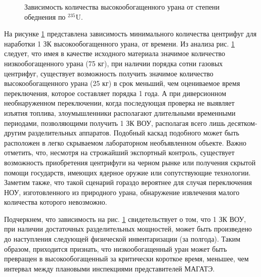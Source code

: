 \begin{figure}[ht]
  \caption{Зависимость количества высокообогащенного урана от степени  обеднения по $^{235}$U.}\label{fig:np2}
\end{figure}

На рисунке \ref{fig:np2} представлена зависимость минимального количества центрифуг для наработки 1 ЗК высокообогащенного урана, от времени.  Из анализа рис. \ref{fig:np2} следует, что имея в качестве исходного материала значимое количество низкообогащенного урана (75 кг), при наличии порядка сотни газовых центрифуг, существует возможность получить значимое количество высокообогащенного урана (25 кг) в срок меньший, чем оцениваемое время переключения, которое составляет порядка 1 года. А при диверсионном необнаруженном переключении, когда последующая проверка не выявляет изъятия топлива, злоумышленники располагают длительными временными периодами, позволяющими получить 1 ЗК ВОУ, располагая всего лишь десятком-другим разделительных аппаратов. Подобный каскад подобного может быть расположен в легко скрываемом лабораторном необъявленном объекте. Важно отметить, что, несмотря на строжайший экспортный контроль, существует возможность приобретения центрифуги на черном рынке или получения скрытой помощи государств, имеющих ядерное оружие или сопутствующие технологии. Заметим также, что такой сценарий гораздо вероятнее для случая переключения НОУ, изготовленного из природного урана, обнаружение извлечения малого количества которого невозможно. 

Подчеркнем, что зависимость на рис. \ref{fig:np2} свидетельствует о том, что 1 ЗК ВОУ, при наличии достаточных разделительных мощностей, может быть произведено до наступления следующей физической инвентаризации (за полгода). Таким образом, приходится признать, что низкообогащенный уран может быть превращен в высокообогащенный за критически короткое время, меньшее, чем интервал между плановыми инспекциями представителей МАГАТЭ. 

